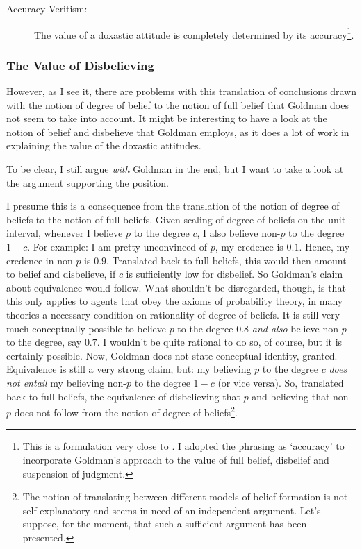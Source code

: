 \documentclass[12pt,numbers=noenddot]{scrartcl}
\begin{document}
\begin{description}
    \item[Accuracy Veritism:] The value of a doxastic attitude is completely determined by its accuracy\footnote{This is a formulation very close to \textcite[9]{Pettigrew2016-PETAAT-7}. I adopted the phrasing as ‘accuracy’ to incorporate Goldman's approach to the value of full belief, disbelief and suspension of judgment.}.
\end{description}

\subsubsection{The Value of Disbelieving}

However, as I see it, there are problems with this translation of conclusions drawn with the notion of degree of belief to the notion of full belief that Goldman does not seem to take into account. It might be interesting to have a look at the notion of belief and disbelieve that Goldman employs, as it does a lot of work in explaining the value of the doxastic attitudes.

To be clear, I still argue \emph{with} Goldman in the end, but I want to take a look at the argument supporting the position.

I presume this is a consequence from the translation of the notion of degree of beliefs to the notion of full beliefs. Given scaling of degree of beliefs on the unit interval, whenever I believe $p$ to the degree $c$, I also believe non-$p$ to the degree $1-c$. For example: I am pretty unconvinced of $p$, my credence is $0.1$. Hence, my credence in non-$p$ is $0.9$. Translated back to full beliefs, this would then amount to belief and disbelieve, if $c$ is sufficiently low for disbelief. 
So Goldman's claim about equivalence would follow. What shouldn't be disregarded, though, is that this only applies to agents that obey the axioms of probability theory, in many theories a necessary condition on rationality of degree of beliefs. It is still very much conceptually possible to believe $p$ to the degree $0.8$ \emph{and also} believe non-$p$ to the degree, say $0.7$. I wouldn't be quite rational to do so, of course, but it is certainly possible. Now, Goldman does not state conceptual identity, granted. Equivalence is still a very strong claim, but: my believing $p$ to the degree $c$ \emph{does not entail} my believing non-$p$ to the degree $1-c$ (or vice versa). 
So, translated back to full beliefs, the equivalence of disbelieving that $p$ and believing that non-$p$ does not follow from the notion of degree of beliefs\footnote{The notion of translating between different models of belief formation is not self-explanatory and seems in need of an independent argument. Let's suppose, for the moment, that such a sufficient argument has been presented.}.
\end{document}
